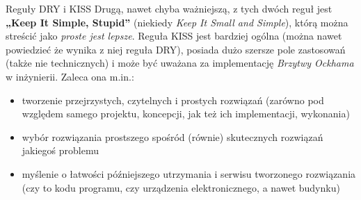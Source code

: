 \begin{ProTip}[breakable]{Reguły DRY i KISS}
Drugą, nawet chyba ważniejszą, z tych dwóch reguł jest \textbf{„Keep It Simple, Stupid”} (niekiedy \textit{Keep It Small and Simple}), którą można streścić jako \textit{proste jest lepsze}.
Reguła KISS jest bardziej ogólna (można nawet powiedzieć że wynika z niej reguła DRY), posiada dużo szersze pole zastosowań (także nie technicznych) i może być uważana za implementację \textit{Brzytwy Ockhama} w inżynierii.
Zaleca ona m.in.:
\begin{itemize}
\item tworzenie przejrzystych, czytelnych i prostych rozwiązań (zarówno pod względem samego projektu, koncepcji, jak też ich implementacji, wykonania)
\item wybór rozwiązania prostszego spośród (równie) skutecznych rozwiązań jakiegoś problemu
\item myślenie o łatwości późniejszego utrzymania i serwisu tworzonego rozwiązania (czy to kodu programu, czy urządzenia elektronicznego, a nawet budynku)
\end{itemize}

\end{ProTip}

